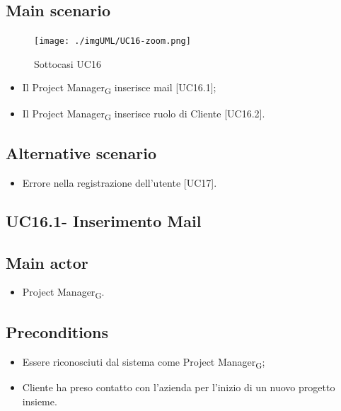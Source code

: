 \documentclass{article}
\begin{document}
    \subsection*{Main scenario}
        \begin{figure}[h]
          \centering
          \texttt{[image: ./imgUML/UC16-zoom.png]}
          \caption{Sottocasi UC16}
          \label{fig:UC16_sottocasi}
        \end{figure}
        
        \begin{itemize}
            \item Il Project Manager\textsubscript{G} inserisce mail [UC16.1];
            \item Il Project Manager\textsubscript{G} inserisce ruolo di Cliente [UC16.2].
        \end{itemize}
        
    \subsection*{Alternative scenario}
        \begin{itemize}
            \item Errore nella registrazione dell'utente [UC17].
        \end{itemize}

    \subsection{UC16.1- Inserimento Mail}
    \subsection*{Main actor}
        \begin{itemize}
            \item Project Manager\textsubscript{G}.
        \end{itemize}
        
    \subsection*{Preconditions}
        \begin{itemize}
            \item Essere riconosciuti dal sistema come Project Manager\textsubscript{G};
            \item Cliente ha preso contatto con l'azienda per l'inizio di un nuovo progetto insieme.
        \end{itemize}
    
\end{document}
